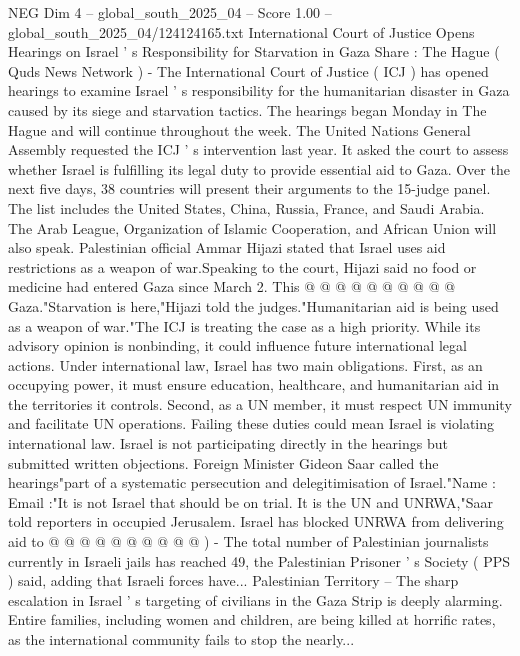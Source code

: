 \begin{textsample}{NEG Dim 4 – global\_south\_2025\_04 – Score 1.00 – global\_south\_2025\_04/124124165.txt}  \label{ex:f4_neg_216}
International Court of Justice Opens Hearings on Israel ' s Responsibility for Starvation in Gaza Share : The Hague ( Quds News Network ) - The International Court of Justice ( ICJ ) has opened hearings to examine Israel ' s responsibility for the humanitarian disaster in Gaza caused by its siege and starvation tactics.
The hearings began Monday in The Hague and will continue throughout the week.
The United Nations General Assembly requested the ICJ ' s intervention last year.
It asked the court to assess whether Israel is fulfilling its legal duty to provide essential aid to Gaza.
Over the next five days, 38 countries will present their arguments to the 15-judge panel.
The list includes the United States, China, Russia, France, and Saudi Arabia.
The Arab League, Organization of Islamic Cooperation, and African Union will also speak.
Palestinian official Ammar Hijazi stated that Israel uses aid restrictions as a weapon of war.Speaking to the court, Hijazi said no food or medicine had entered Gaza since March 2.
This @ @ @ @ @ @ @ @ @ @ Gaza."Starvation is here,"Hijazi told the judges."Humanitarian aid is being used as a weapon of war."The ICJ is treating the case as a high priority.
While its advisory opinion is nonbinding, it could influence future international legal actions.
Under international law, Israel has two main obligations.
First, as an occupying power, it must ensure education, healthcare, and humanitarian aid in the territories it controls.
Second, as a UN member, it must respect UN immunity and facilitate UN operations.
Failing these duties could mean Israel is violating international law.
Israel is not participating directly in the hearings but submitted written objections.
Foreign Minister Gideon Saar called the hearings"part of a systematic persecution and delegitimisation of Israel."Name : Email :"It is not Israel that should be on trial.
It is the UN and UNRWA,"Saar told reporters in occupied Jerusalem.
Israel has blocked UNRWA from delivering aid to @ @ @ @ @ @ @ @ @ @ ) - The total number of Palestinian journalists currently in Israeli jails has reached 49, the Palestinian Prisoner ' s Society ( PPS ) said, adding that Israeli forces have...
Palestinian Territory -- The sharp escalation in Israel ' s targeting of civilians in the Gaza Strip is deeply alarming.
Entire families, including women and children, are being killed at horrific rates, as the international community fails to stop the nearly...

\end{textsample}
